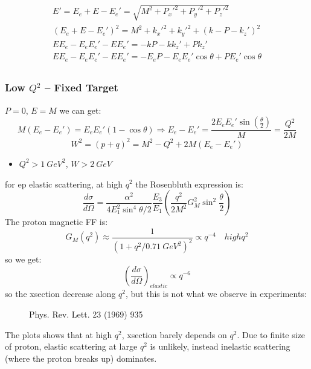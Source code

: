 \begin{equation*}
    \begin{gathered}
	E' = E_e + E - E_e' = \sqrt{M^2 + P_x'^2 + P_y'^2 + P_z'^2} \\
	(E_e + E - E_e')^2 = M^2 + k_x'^2 + k_y'^2 + (k - P - k_z')^2	\\
	EE_e - E_eE_e' - EE_e' = -kP - kk_z' + Pk_z'	\\
	EE_e - E_eE_e' - EE_e' = -E_eP - E_eE_e'\cos\theta + PE_e'\cos\theta	\\
    \end{gathered}
\end{equation*}

\subsubsection{Low $Q^2$ -- Fixed Target}
$P = 0$, $E = M$
we can get:
$$ M(E_e - E_e') = E_eE_e'(1-\cos\theta) \Rightarrow 
    E_e - E_e' = \frac{2E_eE_e'\sin\left(\frac{\theta}{2}\right)}{M} = \frac{Q^2}{2M}$$
$$ W^2 = (p + q)^2 = M^2 - Q^2 + 2M(E_e - E_e') $$

\begin{itemize}
    \item $Q^2 > 1\ GeV^2$, $W > 2\ GeV$
\end{itemize}

for ep elastic scattering, at high $q^2$ the Rosenbluth expression is:
$$ \frac{d\sigma}{d\Omega} = \frac{\alpha^2}{4E_1^2\sin^4\theta/2}\frac{E_3}{E_1}
    \left( \frac{q^2}{2M^2}G_M^2\sin^2\frac{\theta}{2}\right)$$
The proton magnetic FF is:
$$ G_M(q^2) \approx \frac{1}{(1+q^2/0.71\ GeV^2)^2} \propto q^{-4} \quad high q^2$$
so we get:
$$ \left( \frac{d\sigma}{d\Omega}\right)_{elastic} \propto q^{-6} $$
so the xsection decrease along $q^2$, but this is not what we observe in experiments:
\begin{figure}
    \caption{Phys. Rev. Lett. 23 (1969) 935}
\end{figure}
The plots shows that at high $q^2$, xsection barely depends on $q^2$. Due to
finite size of proton, elastic scattering at large $q^2$ is unlikely, instead
inelastic scattering (where the proton breaks up) dominates.

